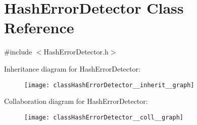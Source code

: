 \hypertarget{classHashErrorDetector}{}\section{Hash\+Error\+Detector Class Reference}
\label{classHashErrorDetector}


{\ttfamily \#include $<$Hash\+Error\+Detector.\+h$>$}



Inheritance diagram for Hash\+Error\+Detector\+:\nopagebreak
\begin{figure}[H]
\begin{center}
\leavevmode
\texttt{[image: classHashErrorDetector\_\_inherit\_\_graph]}
\end{center}
\end{figure}


Collaboration diagram for Hash\+Error\+Detector\+:\nopagebreak
\begin{figure}[H]
\begin{center}
\leavevmode
\texttt{[image: classHashErrorDetector\_\_coll\_\_graph]}
\end{center}
\end{figure}
